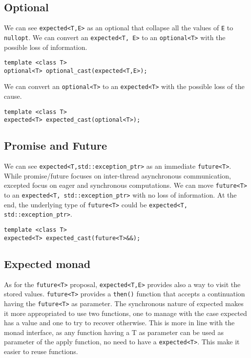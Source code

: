 \documentclass[a4paper,10pt]{article}
\newcommand{\cpp}[1]{\lstinline{#1}}
\begin{document}
\subsection{Optional}

We can see \cpp{expected<T,E>} as an optional that collapse all the values of \cpp{E} to \cpp{nullopt}. We can convert an \cpp{expected<T, E>} to an \cpp{optional<T>} with the possible loss of information.

\begin{lstlisting}
template <class T>
optional<T> optional_cast(expected<T,E>);
\end{lstlisting}

We can convert an \cpp{optional<T>} to an \cpp{expected<T>} with the possible loss of the cause.

\begin{lstlisting}
template <class T>
expected<T> expected_cast(optional<T>);
\end{lstlisting}

\subsection{Promise and Future}

We can see \cpp{expected<T,std::exception_ptr>} as an immediate \cpp{future<T>}.
While promise/future focuses on inter-thread asynchronous communication, excepted focus on eager and synchronous computations.
We can move \cpp{future<T>} to an \cpp{expected<T, std::exception_ptr>} with no loss of information. At the end, the underlying type of \cpp{future<T>} could be \cpp{expected<T, std::exception_ptr>}.

\begin{lstlisting}
template <class T>
expected<T> expected_cast(future<T>&&);
\end{lstlisting}

\subsection{Expected monad}

As for the \cpp{future<T>} proposal, \cpp{expected<T,E>} provides also a way to visit the stored values.
\cpp{future<T>} provides a \cpp{then()} function that accepts a continuation having the \cpp{future<T>} as parameter. The synchronous nature of expected makes it more appropriated to use two functions, one to manage with the case expected has a value and one to try to recover otherwise. This is more in line with the monad interface, as any function having a T as parameter can be used as parameter of the apply function, no need to have a \cpp{expected<T>}. This make it easier to reuse functions. 
\end{document}
